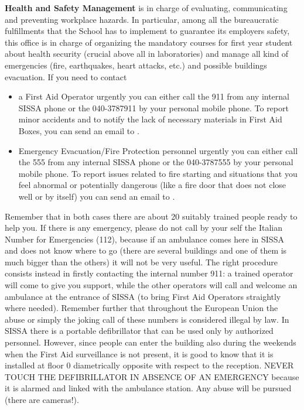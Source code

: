 \documentclass{sissavademecum}
\begin{document}
\textbf{Health and Safety Management} is in charge of evaluating, communicating and preventing workplace hazards. In particular, among all the bureaucratic fulfillments that the School has to implement to guarantee its employers safety, this office is in charge of organizing the mandatory courses for first year student about health security (crucial above all in laboratories) and manage all kind of emergencies (fire, earthquakes, heart attacks, etc.) and possible buildings evacuation. If you need to contact
\begin{itemize}
	\item  a First Aid Operator urgently you can either call the \textcolor[rgb]{0.06666667,0.33333334,0.8}{911} from any internal SISSA phone or the 040-3787911 by your personal mobile phone. To report minor accidents and to notify the lack of necessary materials in First Aid Boxes, you can send an email to . 
	\item Emergency Evacuation/Fire Protection personnel urgently you can either call the \textcolor[rgb]{0.06666667,0.33333334,0.8}{555} from any internal SISSA phone or the 040-3787555 by your personal mobile phone. To report issues related to fire starting and situations that you feel abnormal or potentially dangerous (like a fire door that does not close well or by itself) you can send an email to . 
\end{itemize}
Remember that in both cases there are about 20 suitably trained people ready to help you. If there is any emergency, please do not call by your self the Italian Number for Emergencies (112), because if an ambulance comes here in SISSA and does not know where to go (there are several buildings and one of them is much bigger than the others) it will not be very useful. The right procedure consists instead in firstly contacting the internal number 911: a trained operator will come to give you support, while the other operators will call and welcome an ambulance at the entrance of SISSA (to bring First Aid Operators straightly where needed). Remember further that throughout the European Union the abuse or simply the joking call of these numbers is considered illegal by law. 
In SISSA there is a portable defibrillator that can be used only by authorized personnel. However, since people can enter the building also during the weekends when the First Aid surveillance is not present, it is good to know that it is installed at floor $0$ diametrically opposite with respect to the reception. NEVER TOUCH THE DEFIBRILLATOR IN ABSENCE OF AN EMERGENCY because it is alarmed and linked with the ambulance station. Any abuse will be pursued (there are cameras!). 
\end{document}
